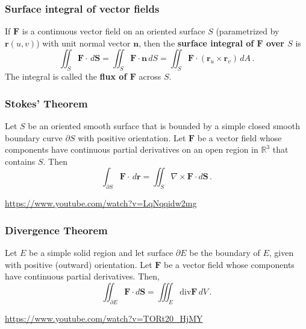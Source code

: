 \documentclass[aspectratio=169]{beamer}
\begin{document}
\begin{frame}
    \frametitle{Surface integral of vector fields}
\begin{definition}
If \(\mathbf{F}\) is a continuous vector field on an oriented surface \(S\) (parametrized by \(\mathbf{r}(u,v)\))
with unit normal vector \(\mathbf{n}\), then the \textbf{surface integral of \(\mathbf{F}\) over
\(S\)} is
\begin{equation*}
    \iint_S \mathbf{F}\cdot \, d\mathbf{S} = \iint_S \mathbf{F}\cdot \mathbf{n} \, dS 
    = \iint_S \mathbf{F}\cdot (\mathbf{r}_u\times \mathbf{r}_v) \, dA \,.
\end{equation*}
The integral is called the \textbf{flux of \(\mathbf{F}\)} across \(S\).
\end{definition}
\end{frame}


\begin{frame}
    \frametitle{Stokes' Theorem}
    \begin{theorem}
Let \(S\) be an oriented smooth surface that is bounded by a simple closed
smooth boundary curve \(\partial S\) with positive orientation.
Let \(\mathbf{F}\) be a vector field whose components have continuous partial
derivatives on an open region in \(\mathbb{R}^3\) that contains \(S\).
Then
\begin{equation*}
    \int_{\partial S} \mathbf{F} \cdot \, d\mathbf{r} = \iint_S \nabla \times \mathbf{F} \cdot d\mathbf{S} \,.
\end{equation*}
\end{theorem}
\url{https://www.youtube.com/watch?v=LqNqqidw2mg}
\end{frame}

\begin{frame}
    \frametitle{Divergence Theorem}
    \begin{theorem}
Let \(E\) be a simple solid region and let surface \(\partial E\) be the boundary of \(E\),
given with positive (outward) orientation.
Let \(\mathbf{F}\) be a vector field whose components have continuous partial derivatives.
Then,
\begin{equation*}
    \iint_{\partial E} \mathbf{F} \cdot d\mathbf{S} = \iiint_E \mathrm{div} \mathbf{F} \, dV \,.
\end{equation*}
\end{theorem}

\url{https://www.youtube.com/watch?v=TORt20_HjMY}

\end{frame}
\end{document}
